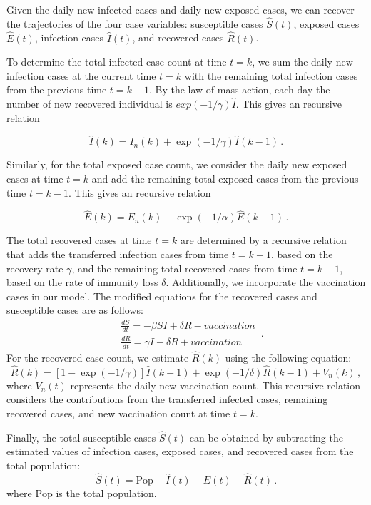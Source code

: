\documentclass[sn-mathphys,Numbered]{sn-jnl}
\begin{document}
Given the daily new infected cases and daily new exposed cases, we can recover the trajectories of the four case variables: susceptible cases $\hat{S}(t)$, exposed cases $\hat{E}(t)$, infection cases $\hat{I}(t)$, and recovered cases $\hat{R}(t)$.

To determine the total infected case count at time $t=k$, we sum the daily new infection cases at the current time $t=k$ with the remaining total infection cases from the previous time $t=k-1$. By the law of mass-action, each day the number of new recovered individual is $exp(-1/\gamma)\hat{I}$. This gives an recursive relation

$$\hat{I}(k) = I_n(k)+\exp(-1/\gamma)\hat{I}(k-1)\, .$$

Similarly, for the total exposed case count, we consider the daily new exposed cases at time $t=k$ and add the remaining total exposed cases from the previous time $t=k-1$. This gives an recursive relation

$$ \hat{E}(k) = E_n(k)+\exp(-1/\alpha)\hat{E}(k-1)\,.$$

The total recovered cases at time $t=k$ are determined by a recursive relation that adds the transferred infection cases from time $t=k-1$, based on the recovery rate $\gamma$, and the remaining total recovered cases from time $t=k-1$, based on the rate of immunity loss $\delta$. Additionally, we incorporate the vaccination cases in our model. The modified equations for the recovered cases and susceptible cases are as follows: 
$$
\begin{aligned}
    & \frac{dS}{dt} = -\beta SI+\delta R - vaccination\\
    & \frac{dR}{dt} = \gamma I - \delta R +vaccination
    \end{aligned}\,.
$$
For the recovered case count, we estimate $\hat{R}(k)$ using the following equation:
$$
\hat{R}(k)=[1-\exp(-1/\gamma)]\hat{I}(k-1)+\exp(-1/\delta)\hat{R}(k-1)+V_n(k)\,,
$$
where $V_n(t)$ represents the daily new vaccination count. This recursive relation considers the contributions from the transferred infected cases, remaining recovered cases, and new vaccination count at time $t=k$.

Finally, the total susceptible cases $\hat{S}(t)$ can be obtained by subtracting the estimated values of infection cases, exposed cases, and recovered cases from the total population:
$$
\hat{S}(t)=\text{Pop}-\hat{I}(t)-\hat{E}(t)-\hat{R}(t)\,.
$$
where $\text{Pop}$ is the total population.

\end{document}
